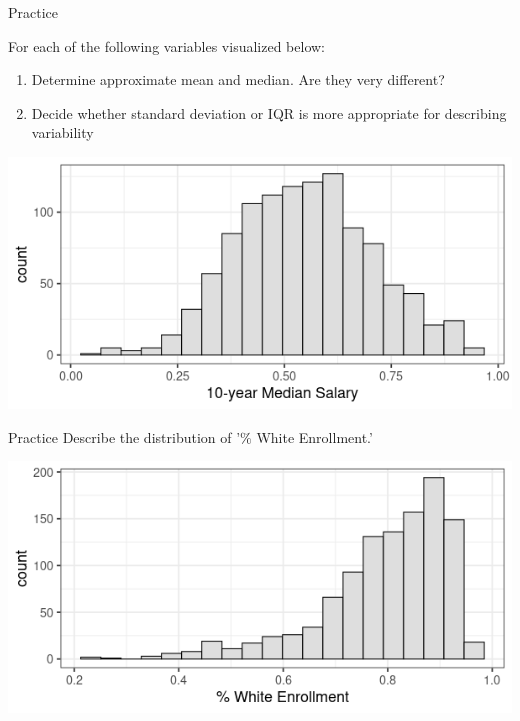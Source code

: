 \documentclass{beamer}
\begin{document}
\begin{frame}{Practice}

{\small
For each of the following variables visualized below:
\begin{enumerate}
\item Determine approximate mean and median. Are they very different?
\item Decide whether standard deviation or IQR is more appropriate for describing variability
\end{enumerate}
}
\begin{center}
\includegraphics[scale=0.5]{mult_dist2.png}
\end{center}
\end{frame}



\begin{frame}{Practice}
Describe the distribution of '$\%$ White Enrollment.'
\begin{center}
\includegraphics[scale=0.5]{mult_dist1.png}
\end{center}
\end{frame}
\end{document}
